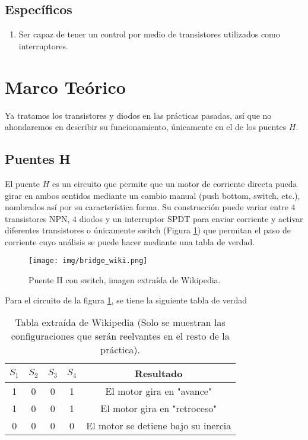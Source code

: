 \documentclass[conference]{IEEEtran}
\begin{document}
\subsection{Específicos}
    \begin{enumerate}
        \item Ser capaz de tener un control por medio de transistores utilizados como interruptores.
    \end{enumerate}
    
\section{Marco Teórico}
Ya tratamos los transistores y diodos en las prácticas pasadas, así que no ahondaremos en describir su funcionamiento, únicamente en el de los puentes $H$.
\subsection{Puentes H}
El puente $H$ es un circuito que permite que un motor de corriente directa pueda girar en ambos sentidos mediante un cambio manual (push bottom, switch, etc.), nombrados así por su característica forma. Su construcción puede variar entre $4$ transistores NPN, $4$ diodos y un interruptor SPDT para enviar corriente y activar diferentes transistores o únicamente switch (Figura \ref{bridge_wiki}) que permitan el paso de corriente cuyo análisis se puede hacer mediante una tabla de verdad.

\begin{figure}[H]
	\centering
	\texttt{[image: img/bridge\_wiki.png]}
	\caption{Puente H con switch, imagen extraída de Wikipedia.}
	\label{bridge_wiki}
\end{figure}
Para el circuito de la figura \ref{bridge_wiki}, se tiene la siguiente tabla de verdad
\begin{table}[H]
	\centering
	\caption{Tabla extraída de Wikipedia (Solo se muestran las configuraciones que serán reelvantes en el resto de la práctica).}
	\begin{tabular}{||c|c|c|c||c||}
		\hline
		\hline
		$S_1$ & $S_2$ & $S_3$ & $S_4$ & \textbf{Resultado} \\
		\hline
		\hline
		1 & 0 & 0 & 1 & El motor gira en "avance" \\
		1 & 0 & 0 & 1 & El motor gira en "retroceso" \\
		0 & 0 & 0 & 0 & El motor se detiene bajo su inercia \\
		\hline
		\hline
	\end{tabular}
\end{table}
    
\end{document}
